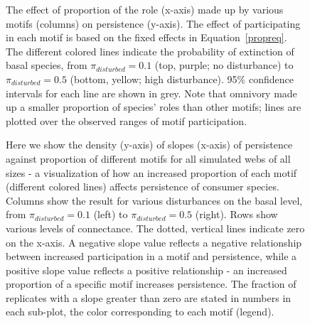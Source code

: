 \documentclass[12pt]{article}
\begin{document}
\begin{spacing}{2.0}

    
        \begin{figure}[hb!]
        \centering
        \caption{The effect of proportion of the role (x-axis) made up by various motifs (columns) on persistence (y-axis). The effect of participating in each motif is based on the fixed effects in Equation~\ref{propreq}. The different colored lines indicate the probability of extinction of basal species, from $\pi_{disturbed} = 0.1$ (top, purple; no disturbance) to $\pi_{disturbed} = 0.5$ (bottom, yellow; high disturbance). 95\% confidence intervals for each line are shown in grey. Note that omnivory made up a smaller proportion of species' roles than other motifs; lines are plotted over the observed ranges of motif participation.}
    \label{fig:prop_lmer_all}
    \end{figure}
        
    \begin{figure}[hb!]
    \centering
        \caption{Here we show the density (y-axis) of slopes (x-axis) of persistence against proportion of different motifs for all simulated webs of all sizes - a visualization of how an increased proportion of each motif (different colored lines) affects persistence of consumer species. Columns show the result for various disturbances on the basal level, from $\pi_{disturbed} = 0.1$ (left) to $\pi_{disturbed} = 0.5$ (right). Rows show various levels of connectance. The dotted, vertical lines indicate zero on the x-axis. A negative slope value reflects a negative relationship between increased participation in a motif and persistence, while a positive slope value reflects a positive relationship - an increased proportion of a specific motif increases persistence. The fraction of replicates with a slope greater than zero are stated in numbers in each sub-plot, the color corresponding to each motif (legend). }
        \label{fig:density_prop}
    \end{figure}    



\end{spacing}
\end{document}
